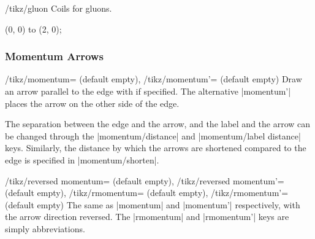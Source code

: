 \documentclass[a4paper,final]{ltxdoc}
\begin{document}
\begin{key}{/tikz/gluon}
  Coils for gluons.

\begin{codeexample}[]
\tikz \draw[gluon] (0, 0) to (2, 0);
\end{codeexample}
\end{key}


\subsubsection{Momentum Arrows}
\label{subsubsec:momentum_arrows}

\begin{keylist}{
    /tikz/momentum= (default empty),
    /tikz/momentum'= (default empty)}
  Draw an arrow parallel to the edge with  if specified.  The
  alternative |momentum'| places the arrow on the other side of the edge.

  The separation between the edge and the arrow, and the label and the arrow can
  be changed through the |momentum/distance| and |momentum/label distance|
  keys.  Similarly, the distance by which the arrows are shortened compared to
  the edge is specified in |momentum/shorten|.

\begin{codeexample}[]
 \end{codeexample}
\end{keylist}

\begin{keylist}{
    /tikz/reversed momentum= (default empty),
    /tikz/reversed momentum'= (default empty),
    /tikz/rmomentum= (default empty),
    /tikz/rmomentum'= (default empty)}
  The same as |momentum| and |momentum'| respectively, with the arrow direction
  reversed.  The |rmomentum| and |rmomentum'| keys are simply abbreviations.

\begin{codeexample}[]
 \end{codeexample}
\end{keylist}
\end{document}
